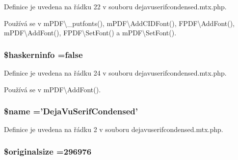 Definice je uvedena na řádku 22 v souboru dejavuserifcondensed.\-mtx.\-php.



Používá se v m\-P\-D\-F\textbackslash{}\-\_\-putfonts(), m\-P\-D\-F\textbackslash{}\-Add\-C\-I\-D\-Font(), F\-P\-D\-F\textbackslash{}\-Add\-Font(), m\-P\-D\-F\textbackslash{}\-Add\-Font(), F\-P\-D\-F\textbackslash{}\-Set\-Font() a m\-P\-D\-F\textbackslash{}\-Set\-Font().

\hypertarget{dejavuserifcondensed_8mtx_8php_ad226b2764d22aeac7b4ec5d56b83128c}{
\subsubsection[{\$haskerninfo}]{\setlength{\rightskip}{0pt plus 5cm}\$haskerninfo ={\bf false}}}\label{dejavuserifcondensed_8mtx_8php_ad226b2764d22aeac7b4ec5d56b83128c}


Definice je uvedena na řádku 24 v souboru dejavuserifcondensed.\-mtx.\-php.



Používá se v m\-P\-D\-F\textbackslash{}\-Add\-Font().

\hypertarget{dejavuserifcondensed_8mtx_8php_ab2fc40d43824ea3e1ce5d86dee0d763b}{
\subsubsection[{\$name}]{\setlength{\rightskip}{0pt plus 5cm}\$name ='Deja\-Vu\-Serif\-Condensed'}}\label{dejavuserifcondensed_8mtx_8php_ab2fc40d43824ea3e1ce5d86dee0d763b}


Definice je uvedena na řádku 2 v souboru dejavuserifcondensed.\-mtx.\-php.

\hypertarget{dejavuserifcondensed_8mtx_8php_a25e8bdbc8267d6e88bc21fde74a2c0e8}{
\subsubsection[{\$originalsize}]{\setlength{\rightskip}{0pt plus 5cm}\$originalsize =296976}}\label{dejavuserifcondensed_8mtx_8php_a25e8bdbc8267d6e88bc21fde74a2c0e8}


